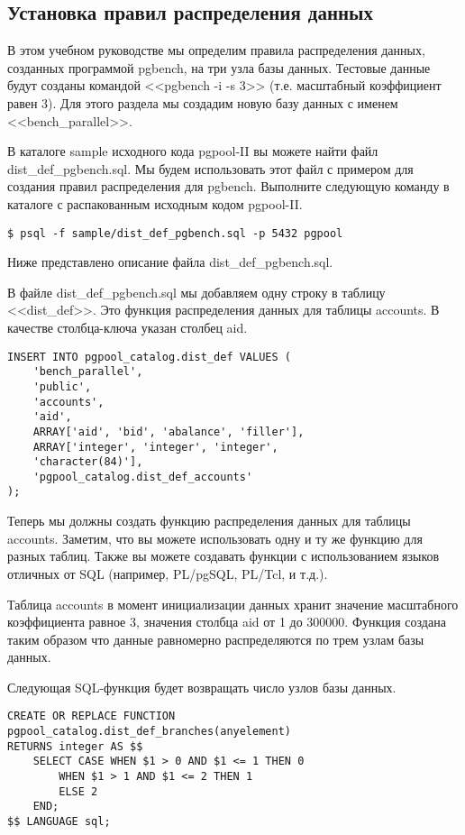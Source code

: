 \subsection{Установка правил распределения данных}
В этом учебном руководстве мы определим правила распределения данных, созданных программой pgbench, на три узла 
базы данных. Тестовые данные будут созданы командой <<pgbench -i -s 3>> (т.е. масштабный коэффициент равен 3). 
Для этого раздела мы создадим новую базу данных с именем <<bench\_parallel>>.

В каталоге sample исходного кода pgpool-II вы можете найти файл dist\_def\_pgbench.sql. Мы будем использовать 
этот файл с примером для создания правил распределения для pgbench. Выполните следующую команду в каталоге с распакованным 
исходным кодом pgpool-II.
\begin{verbatim}
$ psql -f sample/dist_def_pgbench.sql -p 5432 pgpool
\end{verbatim}

Ниже представлено описание файла dist\_def\_pgbench.sql.

В файле dist\_def\_pgbench.sql мы добавляем одну строку в таблицу <<dist\_def>>. Это функция распределения данных 
для таблицы accounts. В качестве столбца-ключа указан столбец aid.
\begin{verbatim}
INSERT INTO pgpool_catalog.dist_def VALUES (
    'bench_parallel',
    'public',
    'accounts',
    'aid',
    ARRAY['aid', 'bid', 'abalance', 'filler'],
    ARRAY['integer', 'integer', 'integer', 
    'character(84)'],
    'pgpool_catalog.dist_def_accounts'
);
\end{verbatim}

Теперь мы должны создать функцию распределения данных для таблицы accounts. Заметим, что вы можете использовать 
одну и ту же функцию для разных таблиц. Также вы можете создавать функции с использованием языков отличных от SQL 
(например, PL/pgSQL, PL/Tcl, и т.д.).

Таблица accounts в момент инициализации данных хранит значение масштабного коэффициента равное 3, значения 
столбца aid от 1 до 300000. Функция создана таким образом что данные равномерно распределяются по трем узлам базы данных.

Следующая SQL-функция будет возвращать число узлов базы данных.
\begin{verbatim}
CREATE OR REPLACE FUNCTION 
pgpool_catalog.dist_def_branches(anyelement)
RETURNS integer AS $$
    SELECT CASE WHEN $1 > 0 AND $1 <= 1 THEN 0
        WHEN $1 > 1 AND $1 <= 2 THEN 1
        ELSE 2
    END;
$$ LANGUAGE sql;
\end{verbatim}


